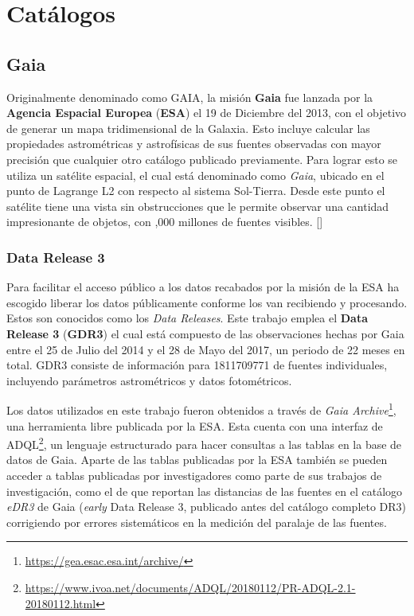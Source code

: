 \chapter{Catálogos}

\section{Gaia} \label{muestra:gaia}

Originalmente denominado como GAIA, la misión \textbf{Gaia} fue lanzada por
la \textbf{Agencia Espacial Europea} (\textbf{ESA}) el 19 de Diciembre del 2013, con el
objetivo de generar un mapa tridimensional de la Galaxia.
Esto incluye calcular las propiedades astrométricas y astrofísicas de sus
fuentes observadas con mayor precisión que cualquier otro catálogo publicado
previamente. Para lograr esto se utiliza un satélite espacial, el cual está
denominado como \textit{Gaia}, ubicado en el punto de Lagrange L2 con respecto al
sistema Sol-Tierra. Desde este punto el satélite tiene una vista sin obstrucciones
que le permite observar una cantidad impresionante de objetos, con ,000 millones de fuentes visibles. [] 

\subsection{Data Release 3}

Para facilitar el acceso público a los datos recabados por la misión de \gaia la
ESA ha escogido liberar los datos públicamente conforme los van recibiendo y
procesando. Estos son conocidos como los \textit{Data Releases}. Este trabajo
emplea el \textbf{Data Release 3} (\textbf{GDR3}) el cual está compuesto de las
observaciones hechas por Gaia entre el 25 de Julio del 2014 y el 28 de Mayo del
2017, un periodo de 22 meses en total. GDR3 consiste de información para
\num{1811709771} de fuentes individuales, incluyendo parámetros astrométricos y
datos fotométricos. 

Los datos utilizados en este trabajo fueron obtenidos a través de
\textit{Gaia Archive}\footnote{\url{https://gea.esac.esa.int/archive/}}, una
herramienta libre publicada por la ESA. Esta cuenta con una interfaz de
ADQL\footnote{\url{https://www.ivoa.net/documents/ADQL/20180112/PR-ADQL-2.1-20180112.html}},
un lenguaje estructurado para hacer consultas a las tablas en la base de datos
de Gaia. Aparte de las tablas publicadas por la ESA también se pueden acceder a
tablas publicadas por investigadores como parte de sus trabajos de
investigación, como el de
 que reportan
las distancias de las fuentes en el catálogo \textit{eDR3} de Gaia
(\textit{early} Data Release 3, publicado antes del catálogo completo DR3)
corrigiendo por errores sistemáticos en la medición del paralaje de las fuentes.


